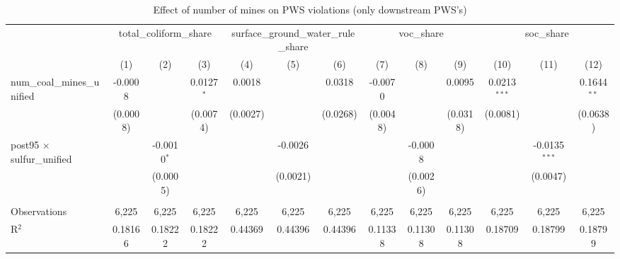 
\begin{table}[htbp]
   \caption{\label{olsrf2sls_nummine_non_mine_vio_1985to2005dwnstrm_coalunified} Effect of number of mines on PWS violations (only downstream PWS's)}
   \bigskip
   \centering
   \begin{adjustbox}{width = \textwidth, center}
      \begin{tabular}{lcccccccccccc}
         \toprule
          & \multicolumn{3}{c}{total\_coliform\_share} & \multicolumn{3}{c}{surface\_ground\_water\_rule\_share} & \multicolumn{3}{c}{voc\_share} & \multicolumn{3}{c}{soc\_share}\\
                                                          & (1)           & (2)           & (3)           & (4)           & (5)           & (6)           & (7)           & (8)                   & (9)                   & (10)           & (11)            & (12)\\  
         \midrule 
         num\_coal\_mines\_unified                        & -0.0008       &               & 0.0127$^{*}$  & 0.0018        &               & 0.0318        & -0.0070       &                       & 0.0095                & 0.0213$^{***}$ &                 & 0.1644$^{**}$\\   
                                                          & (0.0008)      &               & (0.0074)      & (0.0027)      &               & (0.0268)      & (0.0048)      &                       & (0.0318)              & (0.0081)       &                 & (0.0638)\\   
         post95 $\times$ sulfur\_unified                  &               & -0.0010$^{*}$ &               &               & -0.0026       &               &               & -0.0008               &                       &                & -0.0135$^{***}$ &   \\   
                                                          &               & (0.0005)      &               &               & (0.0021)      &               &               & (0.0026)              &                       &                & (0.0047)        &   \\   
          \\
         Observations                                     & 6,225         & 6,225         & 6,225         & 6,225         & 6,225         & 6,225         & 6,225         & 6,225                 & 6,225                 & 6,225          & 6,225           & 6,225\\  
         R$^2$                                            & 0.18166       & 0.18222       & 0.18222       & 0.44369       & 0.44396       & 0.44396       & 0.11338       & 0.11308               & 0.11308               & 0.18709        & 0.18799         & 0.18799\\  

\end{tabular}
\end{adjustbox}
\end{table}
